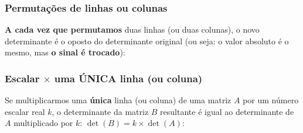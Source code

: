 \documentclass[pdftex, brazil, aspectratio=169]{beamer}
\begin{document}
\begin{frame}[t]
  \frametitle{Permutações de linhas ou colunas}
  \textbf{A cada vez que permutamos} duas linhas (ou duas colunas), o novo
  determinante é o oposto do determinante original (ou seja: o valor absoluto é
  o mesmo, mas \textbf{o sinal é trocado}):


\end{frame}

\begin{frame}[t]
  \frametitle{Escalar $\times$ uma ÚNICA linha (ou coluna)}
  Se multiplicarmos uma \textbf{única} linha (ou coluna) de uma matriz $A$ por
  um número escalar real $k$, o determinante da matriz $B$ resultante é igual ao
  determinante de $A$ multiplicado por $k$: $\det(B) = k \times \det(A)$:

\end{frame}
\end{document}
